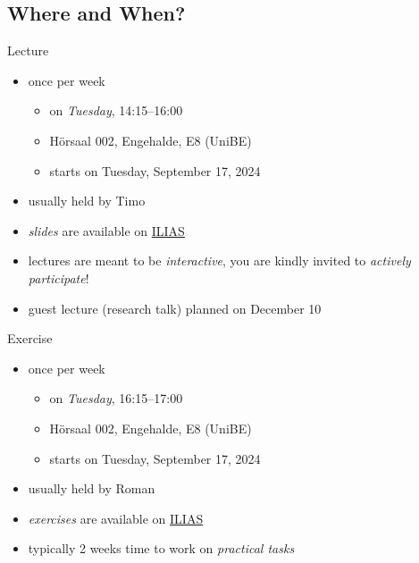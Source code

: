 \subsection{Where and When?}

\begin{frame}{\myframetitle}
	\begin{fancycolumns}
		\begin{definition}{Lecture}
			\begin{itemize}
				\item once per week
				\begin{itemize}
					\item on \emph{Tuesday}, 14:15--16:00
					\item Hörsaal 002, Engehalde, E8 (UniBE)
					\item starts on Tuesday, September 17, 2024
				\end{itemize}
				\item usually held by Timo
				\item \emph{slides} are available on \href{https://ilias.unibe.ch/ilias.php?baseClass=ilrepositorygui&cmd=infoScreenGoto&ref_id=3112374}{ILIAS}
				\item lectures are meant to be \emph{interactive}, you are kindly invited to \emph{actively participate}!
				\item guest lecture (research talk) planned on December 10
			\end{itemize}
		\end{definition}
	\nextcolumn
		\begin{example}{Exercise}
			\begin{itemize}
				\item once per week 
				\begin{itemize}
					\item on \emph{Tuesday}, 16:15--17:00
					\item Hörsaal 002, Engehalde, E8 (UniBE)
					\item starts on Tuesday, September 17, 2024
				\end{itemize}
				\item usually held by Roman
				\item \emph{exercises} are available on \href{https://ilias.unibe.ch/ilias.php?baseClass=ilrepositorygui&cmd=infoScreenGoto&ref_id=3112374}{ILIAS}
				\item typically 2 weeks time to work on \emph{practical tasks}
			\end{itemize}
		\end{example}
	\end{fancycolumns}
\end{frame}

